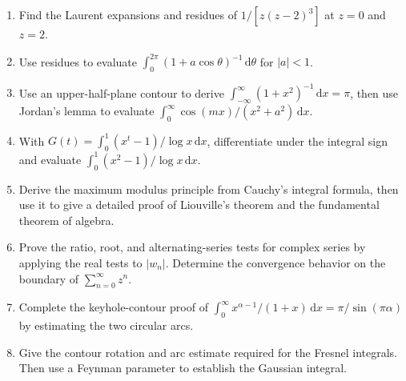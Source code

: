 \begin{enumerate}
    \item Find the Laurent expansions and residues of $1/[z(z-2)^3]$ at $z=0$ and $z=2$.

    \item Use residues to evaluate $\int_0^{2\pi}(1+a\cos\theta)^{-1}\,\mathrm{d}\theta$ for $|a|<1$.

    \item Use an upper-half-plane contour to derive $\int_{-\infty}^{\infty}(1+x^2)^{-1}\,\mathrm{d}x=\pi$, then use Jordan's lemma to evaluate $\int_0^\infty\cos(mx)/(x^2+a^2)\,\mathrm{d}x$.

    \item With $G(t)=\int_0^1(x^t-1)/\log x\,\mathrm{d}x$, differentiate under the integral sign and evaluate $\int_0^1(x^2-1)/\log x\,\mathrm{d}x$.

    \item Derive the maximum modulus principle from Cauchy's integral formula, then use it to give a detailed proof of Liouville's theorem and the fundamental theorem of algebra.

    \item Prove the ratio, root, and alternating-series tests for complex series by applying the real tests to $|w_n|$. Determine the convergence behavior on the boundary of $\sum_{n=0}^\infty z^n$.

    \item Complete the keyhole-contour proof of $\int_0^\infty x^{\alpha-1}/(1+x)\,\mathrm{d}x=\pi/\sin(\pi\alpha)$ by estimating the two circular arcs.

    \item Give the contour rotation and arc estimate required for the Fresnel integrals. Then use a Feynman parameter to establish the Gaussian integral.
\end{enumerate}